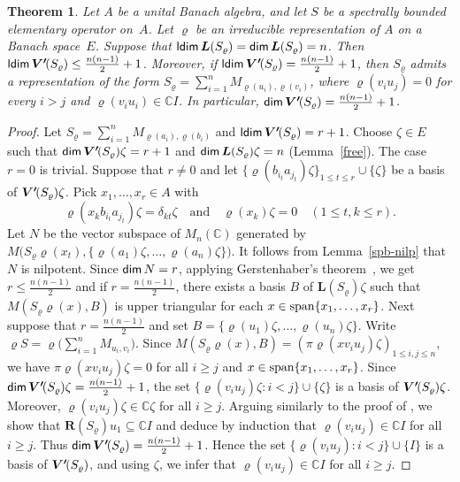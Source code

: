 \documentclass[a4paper,12pt,reqno]{amsart}
\numberwithin{equation}{section}
\newtheorem{thm}{Theorem}[section]
\theoremstyle{definition}
\begin{document}
\begin{thm}\label{spb-Ger}
Let $A$ be a unital Banach algebra, and let ${S}$ be  a spectrally bounded  elementary operator on~$A$.
Let $\varrho$ be an irreducible representation of $A$ on a Banach space~$E$.
Suppose that  ${{\sf ldim}\,}{{\bm L(S_\varrho)}}={{\sf dim}\,}{{\bm L(S_\varrho)}}=n$.
Then ${{\sf ldim}\,}{{\bm{V'}\mkern-2.5mu(S_\varrho)}}\leq\frac{n (n-1)}{2}+1$. Moreover, if ${{\sf ldim}\,}{{\bm{V'}\mkern-2.5mu(S_\varrho)}}= \frac{n(n-1)}{2}+1$,
then $S_\varrho$ admits  a representation of the form $S_\varrho=\sum_{i=1}^n M_{\varrho(u_i),\varrho(v_i)}$,
where $\varrho (v_i u_j) =0$  for every $i> j$ and $\varrho (v_i u_i) \in {\mathbb{C}} I$.
In particular, ${{\sf dim}\,}{{\bm{V'}\mkern-2.5mu(S_\varrho)}}= \frac{n(n-1)}{2}+1$.
\end{thm}
\begin{proof}
Let $S_\varrho= \sum_{i=1}^n M_{\varrho(a_i),\varrho(b_i)}$ and ${{\sf ldim}\,}{{\bm{V'}\mkern-2.5mu(S_\varrho)}}= r+1$.
Choose $\zeta\in E$ such that ${{\sf dim}\,}{{\bm{V'}\mkern-2.5mu(S_\varrho)}}\zeta= r+1$ and ${{\sf dim}\,}{{\bm L(S_\varrho)}}\zeta =n$ (Lemma~\ref{free}).
The case $r=0$ is trivial.
Suppose  that $r \neq 0$ and let $\{ \varrho (b_{i_t} a_{j_t}) \zeta \}_{1 \leq t \leq r } \cup \{ \zeta\}$
be a basis of ${{\bm{V'}\mkern-2.5mu(S_\varrho)}}\zeta$. Pick $x_1, \ldots, x_r \in A$ with
\begin{equation*}
\varrho(x_k b_{i_t} a_{j_t}) \zeta = \delta_{kt} \zeta \quad \text {and} \quad \varrho (x_k) \zeta=0 \quad (1 \leq t, k \leq r).
\end{equation*}
Let $N$ be the vector subspace of $ M_n(\mathbb C)$ generated by
$M\bigl(S_\varrho\varrho (x_t), \{\varrho(a_1) \zeta, \ldots, \varrho (a_n) \zeta \}\bigr)$.
It follows from Lemma~\ref{spb-nilp} that $N$ is nilpotent. Since ${{\sf dim}\,} N=r$, applying Gerstenhaber's theorem~\cite{Ger},
we get $r \leq \frac{n(n-1)}{2}$ and if $r=  \frac{n(n-1)}{2}$,
there exists a basis $B$ of ${{\bm L(S_\varrho)}}\zeta$ such that $M(S_\varrho\varrho(x), B)$ is upper triangular for each
$x \in {{\rm span}} \{ x_1, \ldots, x_r\}$.
Next suppose that $r= \frac{n(n-1)}{2}$  and set $B= \{\varrho(u_1) \zeta, \ldots, \varrho(u_n) \zeta  \}$.
Write  $\varrho{S}= \varrho\bigl(\sum_{i=1}^n M_{u_i,v_i}\bigr)$.
Since $M(S_\varrho\varrho(x), B)= (\pi \varrho(x v_i u_j) \zeta)_{1 \leq i,j \leq n}$, we have $\pi \varrho(x v_i u_j) \zeta=0$ for all
$i \geq j$ and $x \in {{\rm span}} \{x_1, \ldots, x_r \}$.   Since ${{\sf dim}\,}{{\bm{V'}\mkern-2.5mu(S_\varrho)}}\zeta= \frac{n(n-1)}{2}+1$, the set
$ \{ \varrho(v_i u_j) \zeta: i <j \} \cup \{ \zeta \} $ is a basis of ${{\bm{V'}\mkern-2.5mu(S_\varrho)}}\zeta$. Moreover,
$\varrho(v_i u_j ) \zeta \in {\mathbb{C}} \zeta$ for all $i \geq j$. Arguing similarly to the proof of \cite[Theorem~3.3]{NaMa13},
we show that ${{\bm R(S_\varrho)}} u_1\subseteq{\mathbb{C}} I$ and deduce by induction that $\varrho(v_i u_j) \in {\mathbb{C}} I$ for all $i \geq j$.
Thus ${{\sf dim}\,}{{\bm{V'}\mkern-2.5mu(S_\varrho)}}=\frac{n(n-1)}{2}+1$. Hence the set  $\{ \varrho(v_i u_j ): i <j \}\cup \{ I\} $ is a basis of ${{\bm{V'}\mkern-2.5mu(S_\varrho)}}$,
and  using $\zeta$, we infer   that  $\varrho(v_iu_j ) \in {\mathbb{C}} I$ for all $i \geq j$.


\end{proof}
\end{document}
